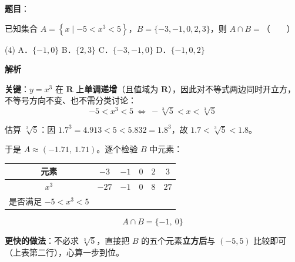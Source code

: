 \begin{answer}

\textbf{题目}：

已知集合 $A=\left\{x\mid -5<x^{3}<5\right\}$，$B=\{-3,-1,0,2,3\}$，则 $A\cap B=$\mbox{（　　）}

\begin{gkopts}(4)
\task A．$\{-1,0\}$
\task B．$\{2,3\}$
\task C．$\{-3,-1,0\}$
\task D．$\{-1,0,2\}$
\end{gkopts}

\textbf{解析}

\textbf{关键}：$y=x^{3}$ 在 $\mathbf R$ 上\textbf{单调递增}（且值域为 $\mathbf R$），因此对不等式两边同时开立方，不等号方向不变、也不需分类讨论：
\nopagebreak[4]
\[-5<x^{3}<5\ \Longleftrightarrow\ -\sqrt[3]5<x<\sqrt[3]5\]

估算 $\sqrt[3]5$：因 $1.7^{3}=4.913<5<5.832=1.8^{3}$，故 $1.7<\sqrt[3]5<1.8$。

于是 $A\approx(-1.71,\ 1.71)$。逐个检验 $B$ 中元素：

\begin{center}
\begin{tabular}{cccccc}
\toprule
元素 & $-3$ & $-1$ & $0$ & $2$ & $3$ \\
\midrule
$x^3$ & $-27$ & $-1$ & $0$ & $8$ & $27$ \\
是否满足 $-5<x^3<5$ &  &  &  &  &  \\
\bottomrule
\end{tabular}
\end{center}

\nopagebreak[4]
\[A\cap B=\{-1,\ 0\}\]

\begin{gktip}
\textbf{更快的做法}：不必求 $\sqrt[3]5$，直接把 $B$ 的五个元素\textbf{立方后}与 $(-5,5)$ 比较即可（上表第二行），心算一步到位。
\end{gktip}


\par\medskip

\end{answer}
